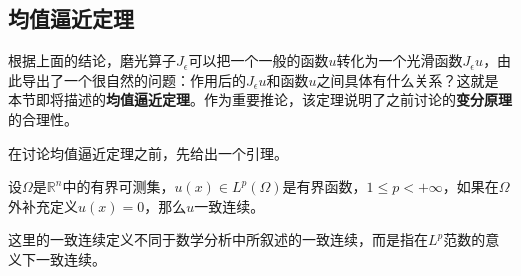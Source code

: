 \subsection{均值逼近定理}
根据上面的结论，磨光算子$J_{\epsilon}$可以把一个一般的函数$u$转化为一个光滑函数$J_{\epsilon}u$，由此导出了一个很自然的问题：作用后的$J_{\epsilon}u$和函数$u$之间具体有什么关系？这就是本节即将描述的\textbf{均值逼近定理}。作为重要推论，该定理说明了之前讨论的\textbf{变分原理}的合理性。

在讨论均值逼近定理之前，先给出一个引理。
\begin{theorem}
    设$\Omega$是$\mathbb{R}^{n}$中的有界可测集，$u(x)\in L^{p}(\Omega)$是有界函数，$1\le p<+\infty$，如果在$\Omega$外补充定义$u(x)=0$，那么$u$一致连续。
\end{theorem}
\begin{remark}
    这里的一致连续定义不同于数学分析中所叙述的一致连续，而是指在$L^{p}$范数的意义下一致连续。
\end{remark}
